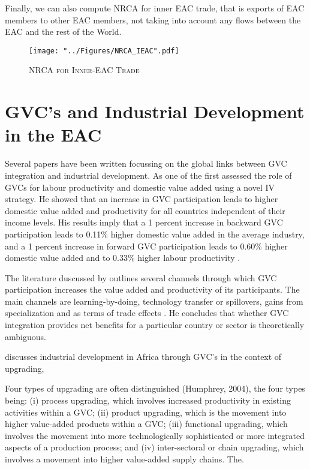 \documentclass[a4paper]{article}
\begin{document}
Finally, we can also compute NRCA for inner EAC trade, that is exports of EAC members to other EAC members, not taking into account any flows between the EAC and the rest of the World. 

\begin{figure}[h!]
\centering
\caption{\label{fig:NRCA_IEAC}\textsc{NRCA for Inner-EAC Trade}}
\texttt{[image: "../Figures/NRCA\_IEAC".pdf]} %
\end{figure}
\FloatBarrier

\section{GVC's and Industrial Development in the EAC}
Several papers have been written focussing on the global links between GVC integration and industrial development. As one of the first \citet{Kummritz20161} assessed the role of GVCs for labour productivity and domestic value added using a novel IV strategy. He showed that an increase in GVC participation leads to higher domestic value added and productivity for all countries independent of their income levels. His results imply that a 1 percent increase in backward GVC participation leads to 0.11\% higher domestic value added in the average industry, and  a 1 percent increase in forward GVC participation leads to 0.60\% higher domestic value added and to 0.33\% higher labour productivity \citep{Kummritz20161}. \newline


The literature duscussed by \citet{Kummritz20161} outlines several channels through which GVC participation increases the value added and productivity of its participants. The main channels are learning-by-doing, technology transfer or spillovers, gains from specialization and as terms of trade effects  \citep{Kummritz20161}. He concludes that whether GVC integration provides net benefits for a particular country or sector is theoretically ambiguous. \newline


\citet{foster2015global} discusses industrial development in Africa through GVC's in the context of upgrading, 

Four types of upgrading are often distinguished (Humphrey, 2004), the four types being: (i) process upgrading, which involves increased productivity in existing activities within a GVC; (ii) product upgrading, which is the movement into higher value-added products within a GVC; (iii) functional upgrading, which involves the movement into more technologically sophisticated or more integrated aspects of a production process; and (iv) inter-sectoral or chain upgrading, which involves a movement into higher value-added supply chains. The.
\end{document}
